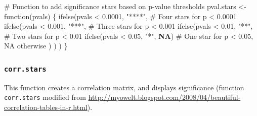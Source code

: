 \documentclass[
  bookmarksnumbered]{article}
\newenvironment{Shaded}{\begin{snugshade}}{\end{snugshade}}
\newcommand{\CommentTok}[1]{\textcolor[rgb]{0.50,0.62,0.50}{#1}}
\newcommand{\ConstantTok}[1]{\textcolor[rgb]{0.86,0.64,0.64}{\textbf{#1}}}
\newcommand{\ControlFlowTok}[1]{\textcolor[rgb]{0.94,0.87,0.69}{#1}}
\newcommand{\FloatTok}[1]{\textcolor[rgb]{0.75,0.75,0.82}{#1}}
\newcommand{\FunctionTok}[1]{\textcolor[rgb]{0.94,0.94,0.56}{#1}}
\newcommand{\NormalTok}[1]{\textcolor[rgb]{0.80,0.80,0.80}{#1}}
\newcommand{\OtherTok}[1]{\textcolor[rgb]{0.94,0.94,0.56}{#1}}
\newcommand{\SpecialCharTok}[1]{\textcolor[rgb]{0.86,0.64,0.64}{#1}}
\newcommand{\StringTok}[1]{\textcolor[rgb]{0.80,0.58,0.58}{#1}}
\begin{document}
\begin{Shaded}
\begin{Highlighting}[]
\CommentTok{\# Function to add significance stars based on p{-}value thresholds}
\NormalTok{pval.stars }\OtherTok{\textless{}{-}} \ControlFlowTok{function}\NormalTok{(pvals) \{}
  \FunctionTok{ifelse}\NormalTok{(pvals }\SpecialCharTok{\textless{}} \FloatTok{0.0001}\NormalTok{, }\StringTok{"****"}\NormalTok{, }\CommentTok{\# Four stars for p \textless{} 0.0001}
    \FunctionTok{ifelse}\NormalTok{(pvals }\SpecialCharTok{\textless{}} \FloatTok{0.001}\NormalTok{, }\StringTok{"***"}\NormalTok{, }\CommentTok{\# Three stars for p \textless{} 0.001}
      \FunctionTok{ifelse}\NormalTok{(pvals }\SpecialCharTok{\textless{}} \FloatTok{0.01}\NormalTok{, }\StringTok{"**"}\NormalTok{, }\CommentTok{\# Two stars for p \textless{} 0.01}
        \FunctionTok{ifelse}\NormalTok{(pvals }\SpecialCharTok{\textless{}} \FloatTok{0.05}\NormalTok{, }\StringTok{"*"}\NormalTok{, }\ConstantTok{NA}\NormalTok{) }\CommentTok{\# One star for p \textless{} 0.05, NA otherwise}
\NormalTok{      )}
\NormalTok{    )}
\NormalTok{  )}
\NormalTok{\}}
\end{Highlighting}
\end{Shaded}

\subsubsection{\texorpdfstring{\texttt{corr.stars}}{corr.stars}}\label{corr.stars}

This function creates a correlation matrix, and displays significance (function \texttt{corr.stars} modified from \url{http://myowelt.blogspot.com/2008/04/beautiful-correlation-tables-in-r.html}).
\end{document}
